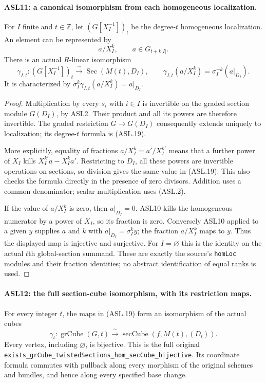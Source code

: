 \paragraph{ASL11: a canonical isomorphism from each homogeneous localization.}
\label{claim:ASL11}
For $I$ finite and $t\in\mathbb Z$, let $(G[X_I^{-1}])_t$
be the degree-$t$ homogeneous localization.  An element can be
represented by
\[
       a/X_I^k,\qquad a\in G_{t+k|I|}.
\]
There is an actual $R$-linear isomorphism
\[
 \gamma_{I,t}:(G[X_I^{-1}])_t
                 \xrightarrow{\ \sim\ }
                       \operatorname{Sec}(M(t),D_I),
 \qquad \gamma_{I,t}(a/X_I^k)=\sigma_I^{-k}(a|_{D_I}).
                                                        \tag{ASL.19}
\]
It is characterized by
$\sigma_I^k\gamma_{I,t}(a/X_I^k)=a|_{D_I}$.

\begin{proof}
Multiplication by every $s_i$ with $i\in I$ is invertible on
the graded section module $G(D_I)$, by ASL2.  Their product
and all its powers are therefore invertible.  The graded
restriction $G\to G(D_I)$ consequently extends uniquely to
localization; its degree-$t$ formula is (ASL.19).

More explicitly, equality of fractions $a/X_I^k=a'/X_I^{k'}$
means that a further power of $X_I$ kills
$X_I^{k'}a-X_I^ka'$.  Restricting to $D_I$, all these powers
are invertible operations on sections, so division gives the same
value in (ASL.19).  This also checks the formula directly in the
presence of zero divisors.  Addition uses a common denominator;
scalar multiplication uses (ASL.2).

If the value of $a/X_I^k$ is zero, then $a|_{D_I}=0$.
ASL10 kills the homogeneous numerator by a power of $X_I$,
so its fraction is zero.  Conversely ASL10 applied to a given
$y$ supplies $a$ and $k$ with $a|_{D_I}=\sigma_I^ky$;
the fraction $a/X_I^k$ maps to $y$.  Thus the displayed map
is injective and surjective.  For $I=\varnothing$ this is the
identity on the actual $t$th global-section summand.  These
are exactly the source's \texttt{hom\allowbreak{}Loc} modules and their
fraction identities; no abstract identification of equal ranks is used.
\end{proof}

\paragraph{ASL12: the full section-cube isomorphism, with its restriction maps.}
\label{claim:ASL12}
For every integer $t$, the maps in (ASL.19) form an isomorphism
of the actual cubes
\[
 \gamma_t:\operatorname{grCube}(G,t)
              \xrightarrow{\ \sim\ }
                  \operatorname{secCube}(f,M(t),(D_i)).
                                                        \tag{ASL.20}
\]
Every vertex, including $\varnothing$, is bijective.  This is
the full original
\texttt{exists\_\allowbreak{}gr\allowbreak{}Cube\_\allowbreak{}twisted\allowbreak{}Sections\_\allowbreak{}hom\_\allowbreak{}sec\allowbreak{}Cube\_\allowbreak{}bijective}.
Its coordinate formula commutes with pullback along every morphism
of the original schemes and bundles, and hence along every
specified base change.

